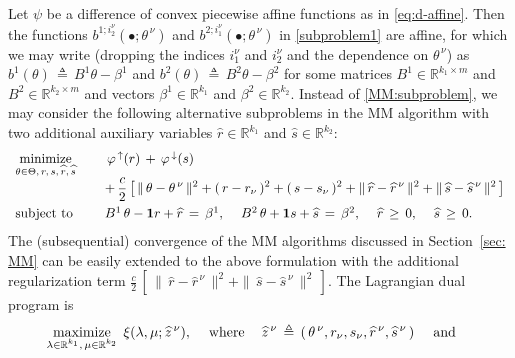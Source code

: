 \documentclass{siamart}
\newcommand{\epc}{\hspace{1pc}}
\newcommand{\wh}{\widehat}
\begin{document}
Let $\psi$ be a difference of convex piecewise affine functions as in \eqref{eq:d-affine}.  Then the
functions $b^{1;i_2^{\nu}}(\bullet;\theta^{\, \nu})$ and $b^{2;i_1^{\nu}}(\bullet;\theta^{\, \nu})$ in \eqref{subproblem1} are affine,
for which we may write (dropping the indices $i_1^{\nu}$ and $i_2^{\nu}$ and the dependence on $\theta^{\, \nu}$) as
$b^1(\theta) \,\triangleq \, B^1\theta -\beta^1$ and $b^2(\theta) \,\triangleq \, B^2\theta-\beta^2$ for some
matrices $B^1 \in \mathbb{R}^{k_1\times m}$ and $B^2\in \mathbb{R}^{k_2\times m}$ and vectors $\beta^1\in \mathbb{R}^{k_1}$
and $\beta^2\in \mathbb{R}^{k_2}$.
Instead of \eqref{MM:subproblem}, we may consider the following alternative subproblems in the MM algorithm with two
additional auxiliary variables $\wh{r}\in \mathbb{R}^{k_1}$ and $\wh{s}\in \mathbb{R}^{k_2}$:
\[\begin{array}{ll}
\displaystyle\operatornamewithlimits{\mbox{minimize}}_{\theta\in \Theta, \,r,\,s,\, \wh{r},\, \wh{s}}\epc  &
 \, \varphi^{\,\uparrow}(r)\,+\,\varphi^{\,\downarrow}(s)\, \\
 & + \,\displaystyle\frac{c}{2}\left[\,\|\,\theta - \theta^{\,\nu}\,\|^2 + (\, r - r_{\nu} \, )^2 + (\, s - s_{\nu} \, )^2 +  \|\,\wh{r} - \wh{r}^{\,\nu}\,\|^2 + \|\,\wh{s} - \wh{s}^{\,\nu}\,\|^2  \,\right]\\[0.1in]
\mbox{subject to} \epc
&  B^1\,\theta - \mathbf{1}r + \wh{r}\,=\,\beta^1,\epc B^2\,\theta + \mathbf{1}s + \wh{s}\,=\, \beta^2,\epc \wh{r}\,\geq \, 0, \epc \wh{s}\,\geq \,0.
\end{array}
\]
The (subsequential) convergence of the MM algorithms discussed in Section~\ref{sec: MM} can be easily extended
to the above formulation with the additional regularization term $\displaystyle\frac{c}{2}\,\left[ \,
\|\,\wh{r} - \wh{r}^{\,\nu}\,\|^2 + \|\,\wh{s} - \wh{s}^{\,\nu}\,\|^2  \,\right]$.
The Lagrangian dual program is
\[
\displaystyle\operatornamewithlimits{\mbox{maximize}}_{\substack{\lambda\in \mathbb{R}^{k_1},\,
\mu\in \mathbb{R}^{k_2}}} \;\xi(\lambda,\mu;\wh{z}^{\,\nu}),
\epc \mbox{where} \epc \wh{z}^{\,\nu}\,\triangleq\, \left(\,\theta^{\,\nu}, r_{\nu}, s_{\nu}, \wh{r}^{\,\nu}, \wh{s}^{\,\nu}\,\right)
\epc \mbox{and}\epc
\]
\vspace{-0.8em}
\end{document}
